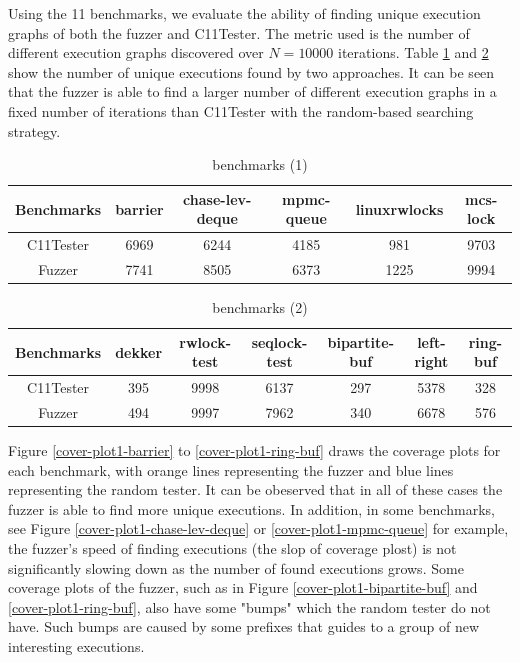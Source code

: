 

Using the 11 benchmarks, we evaluate the ability of finding unique execution graphs of both the fuzzer and C11Tester. The metric used is the number of different execution graphs discovered over $N = 10000$ iterations. Table \ref{c11fuzzer-bench1} and \ref{c11fuzzer-bench2} show the number of unique executions found by two approaches. It can be seen that the fuzzer is able to find a larger number of different execution graphs in a fixed number of iterations than C11Tester with the random-based searching strategy. 


\begin{table}[h!]
    \begin{tabular}{ |c|ccccc| } 
     \hline
     Benchmarks & barrier & chase-lev-deque & mpmc-queue & linuxrwlocks & mcs-lock \\ 
     \hline
     C11Tester & 6969  & 6244 & 4185 &  981 & 9703 \\ 
     Fuzzer & 7741 & 8505  & 6373& 1225 &  9994   \\ 
     \hline
    \end{tabular}
    \caption{benchmarks (1)}
    \label{c11fuzzer-bench1}
    
\end{table}

\begin{table}[h!]
    \begin{tabular}{ |c|cccccc| } 
     \hline
     Benchmarks & dekker & rwlock-test  & seqlock-test &bipartite-buf &  left-right  &   ring-buf \\ 
     \hline
     C11Tester &  395      &     9998     &     6137     &     297      &     5378     &     328   \\ 
     Fuzzer & 494      &     9997     &     7962     &     340      &     6678     &     576    \\ 
     \hline
    \end{tabular}
    \caption{benchmarks (2)}
    \label{c11fuzzer-bench2}
\end{table}

Figure \ref{cover-plot1-barrier} to \ref{cover-plot1-ring-buf} draws the coverage plots for each benchmark, with orange lines representing the fuzzer and blue lines representing the random tester. It can be obeserved that in all of these cases the fuzzer is able to find more unique executions. In addition, in some benchmarks, see Figure \ref{cover-plot1-chase-lev-deque} or \ref{cover-plot1-mpmc-queue} for example, the fuzzer's speed of finding executions (the slop of coverage plost) is not significantly slowing down as the number of found executions grows. Some coverage plots of the fuzzer, such as in Figure \ref{cover-plot1-bipartite-buf} and \ref{cover-plot1-ring-buf}, also have some "bumps" which the random tester do not have. Such bumps are caused by some prefixes that guides to a group of new interesting executions. 

